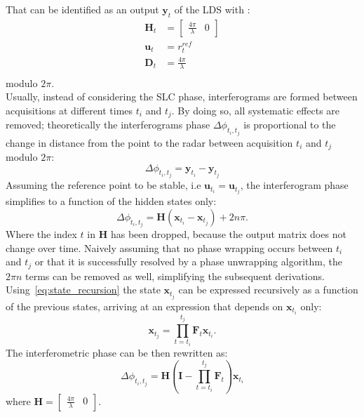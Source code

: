 \documentclass{article}
\begin{document}
That can be identified as an output $\mathbf{y}_t$ of the LDS with :
\begin{equation}\label{eq:slc_phase_output}
	\begin{aligned}
		\mathbf{H}_{t} &=		
						\begin{bmatrix}
							\frac{4\pi}{\lambda} & 0
						\end{bmatrix}\\
		\mathbf{u}_t &= r_{t}^{ref}\\
		\mathbf{D}_t &=\frac{4\pi}{\lambda}\\
	\end{aligned}
\end{equation}	
modulo $2\pi$.\\
Usually, instead of considering the SLC phase, interferograms are formed between acquisitions at different times $t_i$ and $t_j$. By doing so, all systematic effects are removed; theoretically the interferograms phase $\Delta\phi_{t_i,t_j}$ is proportional to the change in distance from the point to the radar between acquisition $t_i$ and $t_j$ modulo $2\pi$:
\begin{equation}
	\Delta\phi_{t_i,t_j} =  \mathbf{y}_{t_{i}} - \mathbf{y}_{t_{j}}
\end{equation}
Assuming the reference point to be stable, i.e $\mathbf{u}_{t_i} = \mathbf{u}_{t_j}$, the interferogram phase simplifies to a function of the hidden states only:
\begin{equation}\label{ifgram_phase}
	\Delta\phi_{t_i,t_j} = \mathbf{H} \left( \mathbf{x}_{t_i} - \mathbf{x}_{t_j} \right) +2 n \pi.
\end{equation}		
Where the index $t$ in $\mathbf{H}$ has been dropped, because the output matrix does not change over time.
Naively assuming that no phase wrapping occurs between $t_{i}$ and $t_{j}$ or that it is successfully resolved by a phase unwrapping algorithm, the $2\pi n$ terms can be removed as well, simplifying the subsequent derivations.
Using~\autoref{eq:state_recursion} the state $\mathbf{x}_{t_j}$ can be expressed recursively as a function of the previous states, arriving at an expression that depends on $\mathbf{x}_{t_i}$ only:
\begin{equation}\label{eq:state_recursion_explicit}
	\mathbf{x}_{t_j} = \prod_{t=t_{i}}^{t_j}\mathbf{F}_t \mathbf{x}_{t_i}.
\end{equation}
The interferometric phase can be then rewritten as:
\begin{equation}\label{eq:single_ifgram}
	\Delta\phi_{t_i,t_j} = \mathbf{H} \left(\mathbf{I} - \prod_{t=t_{i}}^{t_j}\mathbf{F}_t \right)\mathbf{x}_{t_i}
\end{equation}	
where $\mathbf{H} = 
	\begin{bmatrix}
	 \frac{4\pi}{\lambda} & 0
	\end{bmatrix}$.
\end{document}
